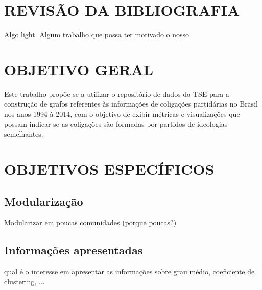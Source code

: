 \section{\texorpdfstring{\MakeUppercase{Revisão da Bibliografia}}{}}
\label{secao_revisao_bibliografia}

Algo light. Algum trabalho que possa ter motivado o nosso



\section{\texorpdfstring{\MakeUppercase{Objetivo Geral}}{}}
\label{secao_objetivo_geral}

Este trabalho propõe-se a utilizar o repositório de dados do \gls{TSE} para a construção de grafos referentes às informações de coligações partidárias no Brasil nos anos 1994 à 2014, com o objetivo de exibir métricas e visualizações que possam indicar se as coligações são formadas por partidos de ideologias semelhantes.

\section{\texorpdfstring{\MakeUppercase{Objetivos Específicos}}{}}
\label{secao_objetivos_especificos}


\subsection{Modularização}
\label{subsecao_modularizacao}

Modularizar em poucas comunidades (porque poucas?)

\subsection{Informações apresentadas}
\label{subsecao_infos_apresentadas}

qual é o interesse em apresentar as informações sobre grau médio, coeficiente de clustering, ...
